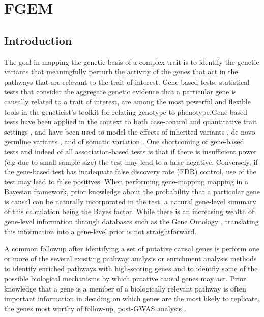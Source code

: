 
\chapter{FGEM}




\section{Introduction}\label{sec:org28fe636}

The goal in mapping the genetic basis of a complex trait is to identify the genetic variants that meaningfully perturb the activity of the genes that act in the pathways that are relevant to the trait of interest.  Gene-based tests, statistical tests that consider the aggregate genetic evidence that a particular gene is causally related to a trait of interest, are among the most powerful and flexible tools in the geneticist's toolkit for relating genotype to phenotype.Gene-based tests have been applied in the context to both case-control \cite{skat} and  quantitative trait settings \cite{predixcan}, and have been used to model the effects of inherited variants \cite{skat}, de novo germline variants \cite{TADA}, and of somatic variation \cite{drivermaps}.  One shortcoming of gene-based tests and indeed of all association-based tests is that if there is insufficient power (e.g due to small sample size) the test may lead to a false negative.  Conversely, if the gene-based test has inadequate false discovery rate (FDR) control, use of the test may lead to false positives. When performing gene-mapping mapping in a Bayesian framework, prior knowledge about the probability that a particular gene is causal can be naturally incorporated in the test, a natural gene-level summary of this calculation being the Bayes factor\cite{drivermaps}.  While there is an increasing wealth of gene-level information through databases such as the Gene Ontology \cite{GO}, translating this information into a gene-level prior is not straightforward.

A common followup after identifying a set of putative causal genes is perform one or more of the several exisiting pathway analysis or enrichment analysis methods \cite{rss-e} \cite{Carbonetto_2013} \cite{Lamparter_2016} to identify enriched pathways with high-scoring genes and to identfiy some of the possible biological mechanisms by which putative causal genes may act. Prior knowledge that a gene is a member of a biologically relevant pathway is often important information in deciding on which genes are the most likely to replicate, the genes most worthy of follow-up, post-GWAS analysis \cite{Hou_2013}.

